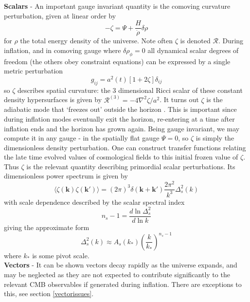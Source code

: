 \documentclass[a4paper,10pt]{article}
\renewcommand{\v}[1]{\mathbf{#1}}
\begin{document}
\textbf{Scalars} - An important gauge invariant quantity is the comoving curvature perturbation, given at linear order by
\begin{equation}
-\zeta = \Psi + \frac{H}{\dot\rho}\delta{\rho} 
\label{zeta}
\end{equation}
for $\rho$ the total energy density of the universe. Note often $\zeta$ is denoted $\mathcal{R}$. During inflation, and in comoving gauge where $\delta{\rho}_\phi = 0$ all dynamical scalar degrees of freedom (the others obey constraint equations) can be expressed by a single metric perturbation 
\begin{equation}
g_{ij} = a^2(t)[1+2\zeta]\delta_{ij}
\end{equation}
so $\zeta$ describes spatial curvature: the 3 dimensional Ricci scalar of these constant density hypersurfaces is given by $\mathcal{R}^{(3)} = -4\nabla^2\zeta / a^2$. It turns out $\zeta$ is the adiabatic mode that `freezes out' outside the horizon \cite{pajer, baumann}. This is important since during inflation modes eventually exit the horizon, re-entering at a time after inflation ends and the horizon has grown again. Being gauge invariant, we may compute it in any gauge - in the spatially flat gauge $\Psi=0$, so $\zeta$ is simply the dimensionless density perturbation. One can construct transfer functions relating the late time evolved values of cosmological fields to this initial frozen value of $\zeta$. \\

Thus $\zeta$ is the relevant quantity describing primordial scalar perturbations. Its dimensionless power spectrum is given by
\begin{equation}
\langle \zeta(\v{k})\zeta(\v{k'}) \rangle=(2\pi)^3\delta(\v{k}+\v{k'})\frac{2\pi^2}{k^3}\Delta^2_s(k)
\end{equation}
with scale dependence described by the scalar spectral index
\begin{equation}
n_s-1 = \frac{d\ln{\Delta^2_s}}{d\ln{k}}
\end{equation}
giving the approximate form 
\begin{equation}
\Delta^2_s(k) \approx A_s(k_*)\left(\frac{k}{k_*}\right)^{n_s-1} 
\end{equation}
where $k_*$ is some pivot scale. \\


\textbf{Vectors} - It can be shown vectors decay rapidly as the universe expands, and may be neglected as they are not expected to contribute significantly to the relevant CMB observables if generated during inflation. There are exceptions to this, see section \ref{vectorissues}.\\
\end{document}

